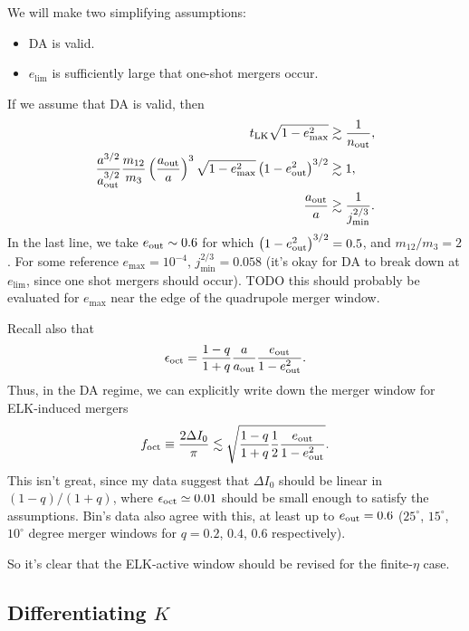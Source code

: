 \documentclass[10pt]{article}%
\newcommand*{\p}[1]{\left(#1\right)}
\begin{document}
We will make two simplifying assumptions:
\begin{itemize}
    \item DA is valid.
    \item $e_{\lim}$ is sufficiently large that one-shot mergers occur.
\end{itemize}
If we assume that DA is valid, then
\begin{align}
    t_{\rm LK}\sqrt{1 - e_{\max}^2} &\gtrsim \frac{1}{n_{\rm out}},\\
    \frac{a^{3/2}}{a_{\rm out}^{3/2}}\frac{m_{12}}{m_3}
        \p{\frac{a_{\rm out}}{a}}^{3}\sqrt{1 - e_{\max}^2}
            \p{1 - e_{\rm out}^2}^{3/2} &\gtrsim 1,\\
    \frac{a_{\rm out}}{a} &\gtrsim \frac{1}{j_{\min}^{2/3}}.
\end{align}
In the last line, we take $e_{\rm out} \sim 0.6$ for which $\p{1 - e_{\rm
out}^2}^{3/2} = 0.5$, and $m_{12} / m_3 = 2$. For some reference $e_{\max} =
10^{-4}$, $j_{\min}^{2/3} = 0.058$ (it's okay for DA to break down at
$e_{\lim}$, since one shot mergers should occur). TODO this should probably be
evaluated for $e_{\max}$ near the edge of the quadrupole merger window.

Recall also that
\begin{equation}
    \epsilon_{\rm oct} = \frac{1 - q}{1 + q}\frac{a}{a_{\rm out}}
        \frac{e_{\rm out}}{1 - e_{\rm out}^2}.
\end{equation}
Thus, in the DA regime, we can explicitly write down the merger window for
ELK-induced mergers
\begin{equation}
    f_{\rm oct} \equiv \frac{2\Delta I_0}{\pi}
        \lesssim \sqrt{\frac{1 - q}{1 + q}\frac{1}{2}\frac{e_{\rm out}}{1 -
            e_{\rm out}^2}}.
\end{equation}
This isn't great, since my data suggest that $\Delta I_0$ should be linear in
$(1-q)/(1+q)$, where $\epsilon_{\rm oct} \simeq 0.01$ should be small enough to
satisfy the assumptions. Bin's data also agree with this, at least up to $e_{\rm
out} = 0.6$ ($25^\circ$, $15^\circ$, $10^\circ$ degree merger windows for $q =
0.2$, $0.4$, $0.6$ respectively).

So it's clear that the ELK-active window should be revised for the finite-$\eta$
case.

\subsection{Differentiating $K$}
\end{document}
